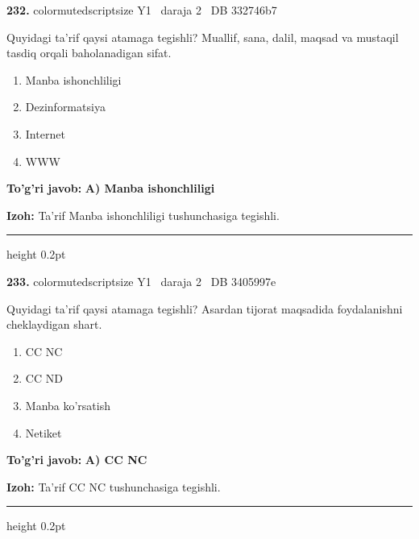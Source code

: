 \documentclass[10pt,a4paper,oneside]{article}
\begin{document}
\noindent\textbf{\color{ink}232.}  {color{muted}scriptsize Y1 \textbullet\ daraja 2 \textbullet\ DB 332746b7}
\par
Quyidagi ta'rif qaysi atamaga tegishli? Muallif, sana, dalil, maqsad va mustaqil tasdiq orqali baholanadigan sifat.
\begin{enumerate}[label=\Alph*),leftmargin=9mm]
\item Manba ishonchliligi
\item Dezinformatsiya
\item Internet
\item WWW
\end{enumerate}
\begin{tcolorbox}[enhanced,breakable,colback=teal!4,colframe=teal!50!black,boxrule=0.5pt,arc=1.1mm,left=3mm,right=3mm,top=1.7mm,bottom=1.7mm,before skip=2mm,after skip=2mm]
\textbf{\color{teal}To'g'ri javob:} \textbf{A) Manba ishonchliligi}
\par\smallskip
\textbf{Izoh:} Ta'rif Manba ishonchliligi tushunchasiga tegishli.
\end{tcolorbox}
\vspace{2mm}\hrule height 0.2pt \vspace{3mm}

\noindent\textbf{\color{ink}233.}  {color{muted}scriptsize Y1 \textbullet\ daraja 2 \textbullet\ DB 3405997e}
\par
Quyidagi ta'rif qaysi atamaga tegishli? Asardan tijorat maqsadida foydalanishni cheklaydigan shart.
\begin{enumerate}[label=\Alph*),leftmargin=9mm]
\item CC NC
\item CC ND
\item Manba ko'rsatish
\item Netiket
\end{enumerate}
\begin{tcolorbox}[enhanced,breakable,colback=teal!4,colframe=teal!50!black,boxrule=0.5pt,arc=1.1mm,left=3mm,right=3mm,top=1.7mm,bottom=1.7mm,before skip=2mm,after skip=2mm]
\textbf{\color{teal}To'g'ri javob:} \textbf{A) CC NC}
\par\smallskip
\textbf{Izoh:} Ta'rif CC NC tushunchasiga tegishli.
\end{tcolorbox}
\vspace{2mm}\hrule height 0.2pt \vspace{3mm}
\end{document}
